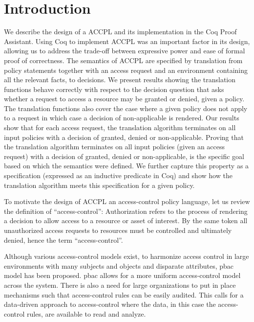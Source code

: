 \documentclass[runningheads,a4paper]{llncs}
\begin{document}
\section{Introduction}\label{sec:intro}
We describe the design of a \ac{ACCPL} and its implementation in the Coq Proof Assistant. Using Coq to implement \ac{ACCPL} was an important factor in its design, allowing us to address the trade-off between expressive power and ease of formal proof of correctness. 
The semantics of \ac{ACCPL} are specified by translation from policy statements together with an access request and an environment containing all the relevant facts, to decisions. We present results showing the translation functions behave correctly with respect to the decision question that asks whether a request to access a resource may be granted or denied, given a policy. The translation functions also cover the case where a given policy does not apply to a request in which case a decision of non-applicable is rendered. Our results show that for each access request, the translation algorithm terminates on all input policies with a decision of granted, denied or non-applicable. Proving that the translation algorithm terminates on all input policies (given an access request) with a decision of granted, denied or non-applicable, is the specific goal based on which the semantics were defined. We further capture this property as a specification (expressed as an inductive predicate in Coq) and show how the translation algorithm meets this specification for a given policy. 

To motivate the design of \ac{ACCPL} an access-control policy language, let us review the definition of ``access-control'': Authorization refers to the process of rendering a decision to allow access to a resource or asset of interest. By the same token all unauthorized access requests to resources must be controlled and ultimately denied, hence the term ``access-control''. 

Although various access-control models exist, to harmonize access control in large environments with many subjects and objects and disparate attributes, \ac{pbac} model has been proposed. \ac{pbac} allows for a more uniform access-control model across the system. There is also a need for large organizations to put in place mechanisms such that access-control rules can be easily audited. This calls for a data-driven approach to access-control where the data, in this case the access-control rules, are available to read and analyze. 
\end{document}
